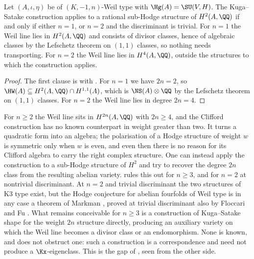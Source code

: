 \begin{corollary}\label{cor:ksboundary}
Let $(A,\iota,\eta)$ be of $(K,-1,n)$-Weil type with $\Hg(A)=\SU(V,H)$. The
Kuga--Satake construction applies to a rational sub-Hodge structure of
$H^{2}(A,\QQ)$ if and only if either $n=1$, or $n=2$ and the discriminant is
trivial. For $n=1$ the Weil line lies in $H^{2}(A,\QQ)$ and consists of
divisor classes, hence of algebraic classes by the Lefschetz theorem on
$(1,1)$ classes, so nothing needs transporting. For $n=2$ the Weil line lies
in $H^{4}(A,\QQ)$, outside the structures to which the construction applies.
\end{corollary}

\begin{proof}
The first clause is  with . For $n=1$
we have $2n=2$, so $\HW(A)\subseteq H^{2}(A,\QQ)\cap H^{1,1}(A)$, which is
$\NS(A)\otimes\QQ$ by the Lefschetz theorem on $(1,1)$ classes. For $n=2$ the
Weil line lies in degree $2n=4$.
\end{proof}

\begin{remark}\label{rem:nohigherks}
For $n\ge2$ the Weil line sits in $H^{2n}(A,\QQ)$ with $2n\ge4$, and the
Clifford construction has no known counterpart in weight greater than two. It
turns a quadratic form into an algebra; the polarisation of a Hodge structure
of weight $w$ is symmetric only when $w$ is even, and even then there is no
reason for its Clifford algebra to carry the right complex structure. One
can instead apply the construction to a sub-Hodge structure of $H^{2}$ and
try to recover the degree $2n$ class from the resulting abelian variety.
 rules this out for $n\ge3$, and for $n=2$ at nontrivial
discriminant. At $n=2$ and trivial discriminant the two structures of K3 type
exist, but the Hodge conjecture for abelian fourfolds of Weil type is in any
case a theorem of Markman \cite{Mar25a,Mar25b}, proved at trivial
discriminant also by Floccari and Fu \cite{FF26}. What remains conceivable for
$n\ge3$ is a construction of Kuga--Satake shape for the weight $2n$ structure
directly, producing an auxiliary variety on which the Weil line becomes a
divisor class or an endomorphism. None is known, and  does
not obstruct one: such a construction is a correspondence and need not
produce a $\Kx$-eigenclass. This is the gap of \cite[Remark~2.4]{paperIII},
seen from the other side.
\end{remark}

